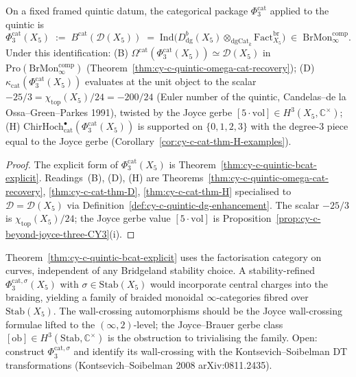 \begin{corollary}
\label{cor:cy-c-quintic-phi-three-cat}
On a fixed framed quintic datum, the categorical package
$\Phi_3^{\mathrm{cat}}$ applied to the quintic is
\[
 \Phi_3^{\mathrm{cat}}(X_5)
 \;:=\;
 B^{\mathrm{cat}}(\mathcal D(X_5))
 \;=\;
 \mathrm{Ind}\!\bigl(
 D^b_{\mathrm{dg}}(X_5) \otimes_{\mathrm{dgCat}_k}
 \mathrm{Fact}^{\mathrm{br}}_{X_5}
 \bigr)
 \;\in\;
 \mathrm{BrMon}^{\mathrm{comp}}_\infty.
\]
Under this identification:
\textup{(B)} $\Omega^{\mathrm{cat}}(\Phi_3^{\mathrm{cat}}(X_5))
 \simeq \mathcal D(X_5)$
in $\mathrm{Pro}(\mathrm{BrMon}^{\mathrm{comp}}_\infty)$
(Theorem~\ref{thm:cy-c-quintic-omega-cat-recovery});
\textup{(D)} $\kappa_{\mathrm{cat}}(\Phi_3^{\mathrm{cat}}(X_5))$
evaluates at the unit object to the scalar
$-25/3 = \chi_{\mathrm{top}}(X_5)/24 = -200/24$ (Euler number of the
quintic, Candelas--de la Ossa--Green--Parkes 1991), twisted by the
Joyce gerbe $[5 \cdot \mathrm{vol}] \in H^3(X_5, \mathbb C^\times)$;
\textup{(H)} $\mathrm{ChirHoch}^\bullet_{\mathrm{cat}}(\Phi_3^{\mathrm{cat}}(X_5))$
is supported on $\{0, 1, 2, 3\}$ with the degree-$3$ piece equal to
the Joyce gerbe (Corollary~\ref{cor:cy-c-cat-thm-H-examples}).
\end{corollary}

\begin{proof}
The explicit form of $\Phi_3^{\mathrm{cat}}(X_5)$ is
Theorem~\ref{thm:cy-c-quintic-bcat-explicit}. Readings~(B), (D), (H)
are Theorems~\ref{thm:cy-c-quintic-omega-cat-recovery},
\ref{thm:cy-c-cat-thm-D}, \ref{thm:cy-c-cat-thm-H} specialised to
$\mathcal D = \mathcal D(X_5)$ via
Definition~\ref{def:cy-c-quintic-dg-enhancement}. The scalar $-25/3$
is $\chi_{\mathrm{top}}(X_5)/24$; the Joyce gerbe value
$[5 \cdot \mathrm{vol}]$ is
Proposition~\ref{prop:cy-c-beyond-joyce-three-CY3}(i).
\end{proof}

\begin{remark}
\label{rem:cy-c-quintic-open-stability}
Theorem~\ref{thm:cy-c-quintic-bcat-explicit} uses the factorisation
category on curves, independent of any Bridgeland stability choice.
A stability-refined $\Phi_3^{\mathrm{cat}, \sigma}(X_5)$ with
$\sigma \in \mathrm{Stab}(X_5)$ would incorporate central charges into
the braiding, yielding a family of braided monoidal $\infty$-categories
fibred over $\mathrm{Stab}(X_5)$. The wall-crossing automorphisms
should be the Joyce wall-crossing formulae lifted to the
$(\infty,2)$-level; the Joyce--Brauer gerbe class
$[\mathrm{ob}] \in H^3(\mathrm{Stab}, \mathbb C^\times)$ is the
obstruction to trivialising the family. Open: construct
$\Phi_3^{\mathrm{cat}, \sigma}$ and identify its wall-crossing with
the Kontsevich--Soibelman DT transformations (Kontsevich--Soibelman
2008 arXiv:0811.2435).
\end{remark}


